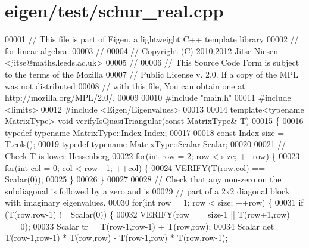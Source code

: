 \hypertarget{eigen_2test_2schur__real_8cpp_source}{}\section{eigen/test/schur\+\_\+real.cpp}
\label{eigen_2test_2schur__real_8cpp_source}

\begin{DoxyCode}
00001 \textcolor{comment}{// This file is part of Eigen, a lightweight C++ template library}
00002 \textcolor{comment}{// for linear algebra.}
00003 \textcolor{comment}{//}
00004 \textcolor{comment}{// Copyright (C) 2010,2012 Jitse Niesen <jitse@maths.leeds.ac.uk>}
00005 \textcolor{comment}{//}
00006 \textcolor{comment}{// This Source Code Form is subject to the terms of the Mozilla}
00007 \textcolor{comment}{// Public License v. 2.0. If a copy of the MPL was not distributed}
00008 \textcolor{comment}{// with this file, You can obtain one at http://mozilla.org/MPL/2.0/.}
00009 
00010 \textcolor{preprocessor}{#include "main.h"}
00011 \textcolor{preprocessor}{#include <limits>}
00012 \textcolor{preprocessor}{#include <Eigen/Eigenvalues>}
00013 
00014 \textcolor{keyword}{template}<\textcolor{keyword}{typename} MatrixType> \textcolor{keywordtype}{void} verifyIsQuasiTriangular(\textcolor{keyword}{const} MatrixType& \hyperlink{group___sparse_core___module}{T})
00015 \{
00016   \textcolor{keyword}{typedef} \textcolor{keyword}{typename} MatrixType::Index \hyperlink{namespace_eigen_a62e77e0933482dafde8fe197d9a2cfde}{Index};
00017 
00018   \textcolor{keyword}{const} Index size = T.cols();
00019   \textcolor{keyword}{typedef} \textcolor{keyword}{typename} MatrixType::Scalar Scalar;
00020 
00021   \textcolor{comment}{// Check T is lower Hessenberg}
00022   \textcolor{keywordflow}{for}(\textcolor{keywordtype}{int} row = 2; row < size; ++row) \{
00023     \textcolor{keywordflow}{for}(\textcolor{keywordtype}{int} col = 0; col < row - 1; ++col) \{
00024       VERIFY(T(row,col) == Scalar(0));
00025     \}
00026   \}
00027 
00028   \textcolor{comment}{// Check that any non-zero on the subdiagonal is followed by a zero and is}
00029   \textcolor{comment}{// part of a 2x2 diagonal block with imaginary eigenvalues.}
00030   \textcolor{keywordflow}{for}(\textcolor{keywordtype}{int} row = 1; row < size; ++row) \{
00031     \textcolor{keywordflow}{if} (T(row,row-1) != Scalar(0)) \{
00032       VERIFY(row == size-1 || T(row+1,row) == 0);
00033       Scalar tr = T(row-1,row-1) + T(row,row);
00034       Scalar det = T(row-1,row-1) * T(row,row) - T(row-1,row) * T(row,row-1);

\end{DoxyCode}
